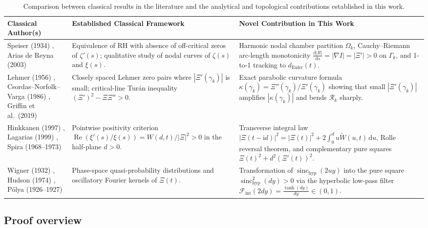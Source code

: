 \documentclass[11pt,a4paper,reqno]{amsart}
\theoremstyle{definition}
\theoremstyle{remark}
\numberwithin{equation}{section}
\newcommand{\dd}{\mathrm{d}}
\newcommand{\ii}{\mathrm{i}}
\newcommand{\Rea}{\operatorname{Re}}
\newcommand{\Wtil}{\widetilde{W}}
\newcommand{\sinch}{\operatorname{sinc}_{\mathrm{hyp}}}
\newcommand{\Fint}{\mathcal{F}_{\mathrm{int}}}
\begin{document}
\begin{table}[htbp]
\centering
\caption{Comparison between classical results in the literature and the analytical and topological contributions established in this work.}\label{tab:literature}
\footnotesize
\begin{tabular}{p{} p{} p{}}
\toprule
\textbf{Classical Author(s)} & \textbf{Established Classical Framework} & \textbf{Novel Contribution in This Work} \\
\midrule
Speiser (1934) \cite{Speiser1934}, Arias de Reyna (2003) \cite{AriasDeReyna2003} & Equivalence of RH with absence of off-critical zeros of $\zeta'(s)$; qualitative study of nodal curves of $\zeta(s)$ and $\xi(s)$. & Harmonic nodal chamber partition $\Omega_k$, Cauchy--Riemann arc-length monotonicity $\frac{\dd|R|}{\dd s} = |\nabla I| = |\Xi'| > 0$ on $\Gamma_k$, and 1-to-1 tracking to $d_{\mathrm{Euler}}(t)$. \\
\addlinespace[3pt]
Lehmer (1956) \cite{Lehmer1956}, Csordas--Norfolk--Varga (1986) \cite{Csordas1986}, Griffin et al.\ (2019) \cite{Griffin2019} & Closely spaced Lehmer zero pairs where $|\Xi'(\gamma_k)|$ is small; critical-line Tur\'an inequality $(\Xi')^2 - \Xi\Xi'' > 0$. & Exact parabolic curvature formula $\kappa(\gamma_k) = \Xi''(\gamma_k)/\Xi'(\gamma_k)$ showing that small $|\Xi'(\gamma_k)|$ amplifies $|\kappa(\gamma_k)|$ and bends $\mathcal{R}_k$ sharply. \\
\addlinespace[3pt]
Hinkkanen (1997) \cite{Hinkkanen1997}, Lagarias (1999) \cite{Lagarias1999}, Spira (1968--1973) \cite{Spira1968,Spira1973} & Pointwise positivity criterion $\Rea(\xi'(s)/\xi(s)) = W(d,t)/|\Xi|^2 > 0$ in the half-plane $d > 0$. & Transverse integral law $|\Xi(t-\ii d)|^2 = |\Xi(t)|^2 + 2\int_0^d u\Wtil(u,t)\,\dd u$, Rolle reversal theorem, and complementary pure squares $\Xi(t)^2 + d^2(\Xi'(t))^2$. \\
\addlinespace[3pt]
Wigner (1932) \cite{Wigner1932}, Hudson (1974) \cite{Hudson1974}, P\'olya (1926--1927) \cite{Polya1926,Polya1927} & Phase-space quasi-probability distributions and oscillatory Fourier kernels of $\Xi(t)$. & Transformation of $\sinch(2u y)$ into the pure square $\sinch^2(d y) > 0$ via the hyperbolic low-pass filter $\Fint(2d y) = \frac{\tanh(d y)}{d y} \in (0,1)$. \\
\bottomrule
\end{tabular}
\end{table}

\subsection{Proof overview}\label{subsec:proof_overview}
\end{document}
